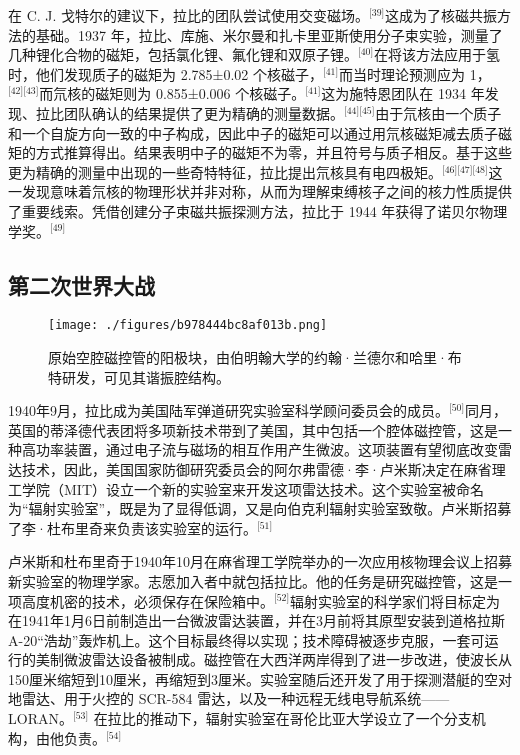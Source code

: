 在 C. J. 戈特尔的建议下，拉比的团队尝试使用交变磁场。\(^\text{[39]}\)这成为了核磁共振方法的基础。1937 年，拉比、库施、米尔曼和扎卡里亚斯使用分子束实验，测量了几种锂化合物的磁矩，包括氯化锂、氟化锂和双原子锂。\(^\text{[40]}\)在将该方法应用于氢时，他们发现质子的磁矩为 2.785±0.02 个核磁子，\(^\text{[41]}\)而当时理论预测应为 1，\(^\text{[42][43]}\)而氘核的磁矩则为 0.855±0.006 个核磁子。\(^\text{[41]}\)这为施特恩团队在 1934 年发现、拉比团队确认的结果提供了更为精确的测量数据。\(^\text{[44][45]}\)由于氘核由一个质子和一个自旋方向一致的中子构成，因此中子的磁矩可以通过用氘核磁矩减去质子磁矩的方式推算得出。结果表明中子的磁矩不为零，并且符号与质子相反。基于这些更为精确的测量中出现的一些奇特特征，拉比提出氘核具有电四极矩。\(^\text{[46][47][48]}\)这一发现意味着氘核的物理形状并非对称，从而为理解束缚核子之间的核力性质提供了重要线索。凭借创建分子束磁共振探测方法，拉比于 1944 年获得了诺贝尔物理学奖。\(^\text{[49]}\)
\subsection{第二次世界大战}
\begin{figure}[ht]
\centering
\texttt{[image: ./figures/b978444bc8af013b.png]}
\caption{原始空腔磁控管的阳极块，由伯明翰大学的约翰·兰德尔和哈里·布特研发，可见其谐振腔结构。} \label{fig_YXDlb_3}
\end{figure}
1940年9月，拉比成为美国陆军弹道研究实验室科学顾问委员会的成员。\(^\text{[50]}\)同月，英国的蒂泽德代表团将多项新技术带到了美国，其中包括一个腔体磁控管，这是一种高功率装置，通过电子流与磁场的相互作用产生微波。这项装置有望彻底改变雷达技术，因此，美国国家防御研究委员会的阿尔弗雷德·李·卢米斯决定在麻省理工学院（MIT）设立一个新的实验室来开发这项雷达技术。这个实验室被命名为“辐射实验室”，既是为了显得低调，又是向伯克利辐射实验室致敬。卢米斯招募了李·杜布里奇来负责该实验室的运行。\(^\text{[51]}\)

卢米斯和杜布里奇于1940年10月在麻省理工学院举办的一次应用核物理会议上招募新实验室的物理学家。志愿加入者中就包括拉比。他的任务是研究磁控管，这是一项高度机密的技术，必须保存在保险箱中。\(^\text{[52]}\)辐射实验室的科学家们将目标定为在1941年1月6日前制造出一台微波雷达装置，并在3月前将其原型安装到道格拉斯 A-20“浩劫”轰炸机上。这个目标最终得以实现；技术障碍被逐步克服，一套可运行的美制微波雷达设备被制成。磁控管在大西洋两岸得到了进一步改进，使波长从150厘米缩短到10厘米，再缩短到3厘米。实验室随后还开发了用于探测潜艇的空对地雷达、用于火控的 SCR-584 雷达，以及一种远程无线电导航系统——LORAN。\(^\text{[53]}\) 在拉比的推动下，辐射实验室在哥伦比亚大学设立了一个分支机构，由他负责。\(^\text{[54]}\)

